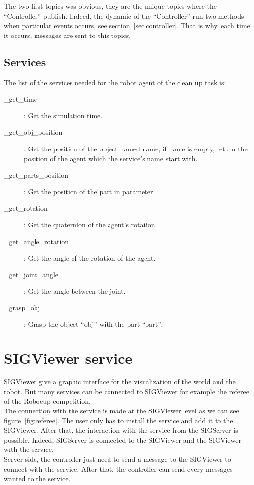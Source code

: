 The two first topics was obvious, they are the unique topics where the ``Controller'' publish. Indeed, the dynamic of the ``Controller'' run two methods when particular events occurs, see section~\ref{sec:controller}. That is why, each time it occurs, messages are sent to this topics.

\subsection{Services}
The list of the services needed for the robot agent of the clean up task is:
\begin{description}
	\item[\_get\_time] : Get the simulation time.
	\item[\_get\_obj\_position] : Get the position of the object named name, if name is empty, return the position of the agent which the service's name start with.
	\item[\_get\_parts\_position] : Get the position of the part in parameter.
	\item[\_get\_rotation] : Get the quaternion of the agent's rotation.
	\item[\_get\_angle\_rotation] : Get the angle of the rotation of the agent.
	\item[\_get\_joint\_angle]: Get the angle between the joint.
	\item[\_grasp\_obj]: Grasp the object ``obj'' with the part ``part''.
\end{description}


\section{SIGViewer service}
SIGViewer give a graphic interface for the visualization of the world and the robot. But many services can be connected to SIGViewer for example the referee of the Robocup competition.\\
The connection with the service is made at the SIGViewer level as we can see figure~\ref{fig:referee}. The user only has to install the service and add it to the SIGViewer. After that, the interaction with the service from the SIGServer is possible. Indeed, SIGServer is connected to the SIGViewer and the SIGViewer with the service.\\
Server side, the controller just need to send a message to the SIGViewer to connect with the service. After that, the controller can send every messages wanted to the service.\\

